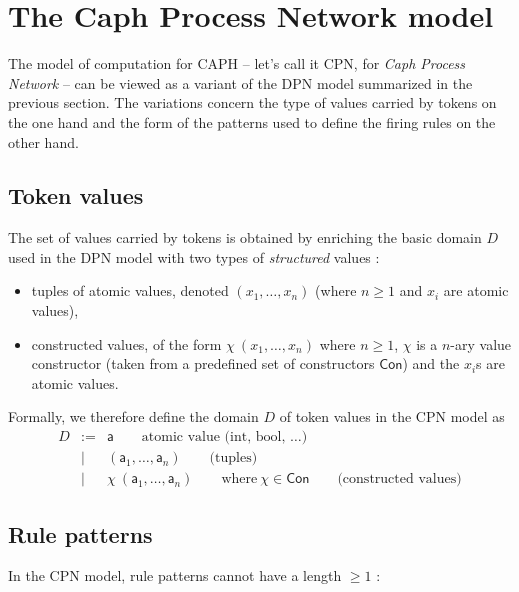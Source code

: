\section{The Caph Process Network model}
\label{sec:caph-moc}

The model of computation for CAPH -- let's call it CPN, for \emph{Caph Process Network} -- can be
viewed as a variant of the DPN model summarized in the previous section. The variations concern the
type of values carried by tokens on the one hand and the form of the patterns used to define the
firing rules on the other hand.

\subsection{Token values}
\label{cpn-token-value}

\newcommand{\mocatom}{\mathsf{a}}
\newcommand{\mocvar}{\mathsf{v}}
\newcommand{\mocconst}{\mathsf{c}}
\newcommand{\moctuple}{(\mocatom_1,\ldots,\mocatom_n)}
\newcommand{\moccon}{\chi\ (\mocatom_1,\ldots,\mocatom_n)}

The set of values carried by tokens is obtained by enriching the basic domain $D$ used in the DPN
model with two types of \emph{structured} values :
\begin{itemize}
\item tuples of atomic values, denoted $(x_1,\ldots,x_n)$ (where $n \geq 1$ and $x_i$ are atomic values),
\item constructed values, of the form $\chi\ (x_1,\ldots,x_n)$ where $n \geq 1$, $\chi$ is a $n$-ary
  value constructor (taken from a predefined set of constructors $\mathsf{Con}$) and the $x_i$s are
  atomic values.
\end{itemize}
Formally, we therefore define the domain $D$ of token values in the CPN model as
\begin{eqnarray*}
  D & := & \mocatom \qquad \text{atomic value (int, bool, \ldots)} \\
    & |  & \moctuple \qquad \text{(tuples)} \\
    & |  & \moccon \qquad \text{where}\ \chi \in \mathsf{Con} \qquad (\text{constructed values)}
\end{eqnarray*}

\subsection{Rule patterns}
\label{cpn-rpatterns}

In the CPN model, rule patterns cannot have a length $\ge 1$ :

